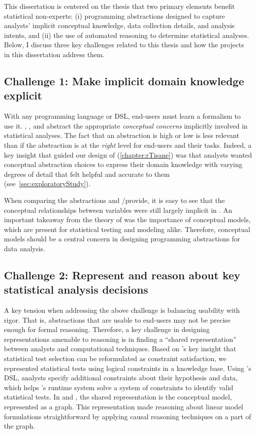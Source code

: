 This dissertation is centered on the thesis that two primary elements benefit
statistical non-experts: (i) programming abstractions designed to capture
analysts' implicit conceptual knowledge, data collection details, and analysis
intents, and (ii) the use of automated reasoning to determine statistical
analyses. Below, I discuss three key challenges related to this thesis and
how the projects in this dissertation address them.

\subsection{Challenge 1: Make implicit domain knowledge explicit} 
With any programming language or DSL, end-users must learn a formalism to use
it. \tea, \tisane, and \rTisane abstract the appropriate \textit{conceptual
concerns} implicitly involved in statistical analyses. The fact that an
abstraction is high or low is less relevant than if the abstraction is at the
\textit{right} level for end-users and their tasks. Indeed, a key insight that
guided our design of \rTisane (\autoref{chapter:rTisane}) was that analysts wanted
conceptual abstraction choices to express their domain knowledge
with varying degrees of detail that felt helpful and accurate to them
(see~\autoref{sec:exploratoryStudy}). %

When comparing the abstractions \tea and \tisane/\rTisane provide, it is easy to see that
the conceptual relationships between variables were still largely implicit in
\tea. An important takeaway from the theory of \hypoForm was the importance of
conceptual models, which are present for statistical testing and modeling alike.
Therefore, conceptual models should be a central concern in designing
programming abstractions for data analysis. 

\subsection{Challenge 2: Represent and reason about key statistical analysis decisions}
A key tension when addressing the above challenge is balancing usability with
rigor. That is, abstractions that are usable to end-users may not be precise
enough for formal reasoning. Therefore, a key challenge in designing
representations amenable to reasoning is in finding a ``shared
representation''~\cite{heer2019agency} between analysts and computational
techniques. Based on \tea's key insight that statistical test selection can be
reformulated as constraint satisfaction, we represented statistical
tests using logical constraints in a knowledge base. Using \tea's DSL, analysts
specify additional constraints about their hypothesis and data, which helps
\tea's runtime system solve a system of constraints to identify valid
statistical tests. In \tisane and \rTisane, the shared representation is the
conceptual model, represented as a graph. This representation made
reasoning about linear model formulations straightforward by applying causal
reasoning techniques on a part of the graph. 

